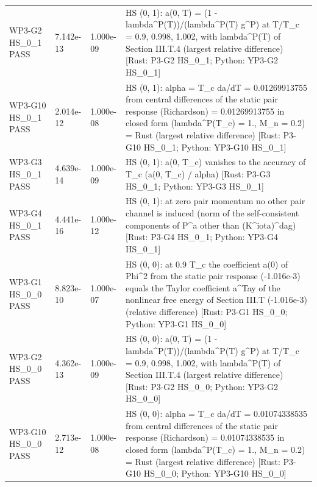 \documentclass[aps,prd,onecolumn,superscriptaddress,nofootinbib,floatfix,longbibliography]{revtex4-2}
\begin{document}
\begin{longtable}{p{}p{}p{}p{}}
WP3-G2 HS\_0\_1 \newline PASS & 7.142e-13 & 1.000e-09 & HS (0, 1): a(0, T) = (1 - lambda\textasciicircum{}P(T))/(lambda\textasciicircum{}P(T) g\textasciicircum{}P) at T/T\_c = 0.9, 0.998, 1.002, with lambda\textasciicircum{}P(T) of Section III.T.4 (largest relative difference) [Rust: P3-G2 HS\_0\_1; Python: YP3-G2 HS\_0\_1] \\
WP3-G10 HS\_0\_1 \newline PASS & 2.014e-12 & 1.000e-08 & HS (0, 1): alpha = T\_c da/dT = 0.01269913755 from central differences of the static pair response (Richardson) = 0.01269913755 in closed form (lambda\textasciicircum{}P(T\_c) = 1., M\_n = 0.2) = Rust (largest relative difference) [Rust: P3-G10 HS\_0\_1; Python: YP3-G10 HS\_0\_1] \\
WP3-G3 HS\_0\_1 \newline PASS & 4.639e-14 & 1.000e-09 & HS (0, 1): a(0, T\_c) vanishes to the accuracy of T\_c (\textbar{}a(0, T\_c)\textbar{} / alpha) [Rust: P3-G3 HS\_0\_1; Python: YP3-G3 HS\_0\_1] \\
WP3-G4 HS\_0\_1 \newline PASS & 4.441e-16 & 1.000e-12 & HS (0, 1): at zero pair momentum no other pair channel is induced (norm of the self-consistent components of P\textasciicircum{}a other than (K\textasciicircum{}iota)\textasciicircum{}dag) [Rust: P3-G4 HS\_0\_1; Python: YP3-G4 HS\_0\_1] \\
WP3-G1 HS\_0\_0 \newline PASS & 8.823e-10 & 1.000e-07 & HS (0, 0): at 0.9 T\_c the coefficient a(0) of \textbar{}Phi\textbar{}\textasciicircum{}2 from the static pair response (-1.016e-3) equals the Taylor coefficient a\textasciicircum{}Tay of the nonlinear free energy of Section III.T (-1.016e-3) (relative difference) [Rust: P3-G1 HS\_0\_0; Python: YP3-G1 HS\_0\_0] \\
WP3-G2 HS\_0\_0 \newline PASS & 4.362e-13 & 1.000e-09 & HS (0, 0): a(0, T) = (1 - lambda\textasciicircum{}P(T))/(lambda\textasciicircum{}P(T) g\textasciicircum{}P) at T/T\_c = 0.9, 0.998, 1.002, with lambda\textasciicircum{}P(T) of Section III.T.4 (largest relative difference) [Rust: P3-G2 HS\_0\_0; Python: YP3-G2 HS\_0\_0] \\
WP3-G10 HS\_0\_0 \newline PASS & 2.713e-12 & 1.000e-08 & HS (0, 0): alpha = T\_c da/dT = 0.01074338535 from central differences of the static pair response (Richardson) = 0.01074338535 in closed form (lambda\textasciicircum{}P(T\_c) = 1., M\_n = 0.2) = Rust (largest relative difference) [Rust: P3-G10 HS\_0\_0; Python: YP3-G10 HS\_0\_0] \\

\end{longtable}
\end{document}
